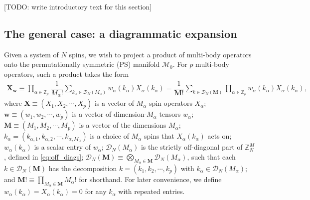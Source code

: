 \documentclass[nofootinbib,notitlepage,11pt]{revtex4-2}
\newcommand{\f}[2]{\dfrac{#1}{#2}} %
\newcommand{\p}[1]{\left(#1\right)} %
\newcommand{\m}{\bm} %
\newcommand{\1}{\mathds{1}}
\newcommand{\D}{\mathcal{D}}
\newcommand{\M}{\mathcal{M}}
\newcommand{\ZZ}{\mathbb{Z}}
\newcommand{\red}[1]{{\color{red} #1}}
\begin{document}
\red{[TODO: write introductory text for this section]}

\subsection{The general case: a diagrammatic expansion}

Given a system of $N$ spins, we wish to project a product of
multi-body operators onto the permutationally symmetric (PS) manifold
$\M_0$.  For $p$ multi-body operators, such a product takes the form
\begin{align}
  \m X_{\m w}
  \equiv \prod_{\alpha\in\ZZ_p} \f1{M_\alpha!}
  \sum_{k_\alpha\in\D_N\p{M_\alpha}}
  w_\alpha\p{k_\alpha} X_\alpha\p{k_\alpha}
  = \f1{\m M!} \sum_{k\in\D_N\p{\m M}} \prod_{\alpha\in\ZZ_p}
  w_\alpha\p{k_\alpha} X_\alpha\p{k_\alpha},
  \label{eq:sym_prod_start}
\end{align}
where $\m X\equiv\p{X_1,X_2,\cdots,X_p}$ is a vector of
$M_\alpha$-spin operators $X_\alpha$;
$\m w\equiv\p{w_1,w_2,\cdots,w_p}$ is a vector of dimension-$M_\alpha$
tensors $w_\alpha$; $\m M\equiv\p{M_1,M_2,\cdots,M_p}$ is a vector of
the dimensions $M_\alpha$;
$k_\alpha=\p{k_{\alpha,1},k_{\alpha,2},\cdots,k_{\alpha,M_\alpha}}$ is
a choice of $M_\alpha$ spins that $X_\alpha\p{k_\alpha}$ acts on;
$w_\alpha\p{k_\alpha}$ is a scalar entry of $w_\alpha$;
$\D_N\p{M_\alpha}$ is the strictly off-diagonal part of $\ZZ_N^M$,
defined in \eqref{eq:off_diags};
$\D_N\p{\m M}\equiv\bigotimes_{M_\alpha\in\m M}\D_N\p{M_\alpha}$, such
that each $k\in\D_N\p{\m M}$ has the decomposition
$k=\p{k_1,k_2,\cdots,k_p}$ with $k_\alpha\in\D_N\p{M_\alpha}$; and
$\m M!\equiv\prod_{M_\alpha\in\m M}M_\alpha!$ for shorthand.  For
later convenience, we define
$w_\alpha\p{k_\alpha}=X_\alpha\p{k_\alpha}=0$ for any $k_\alpha$ with
repeated entries.
\end{document}

